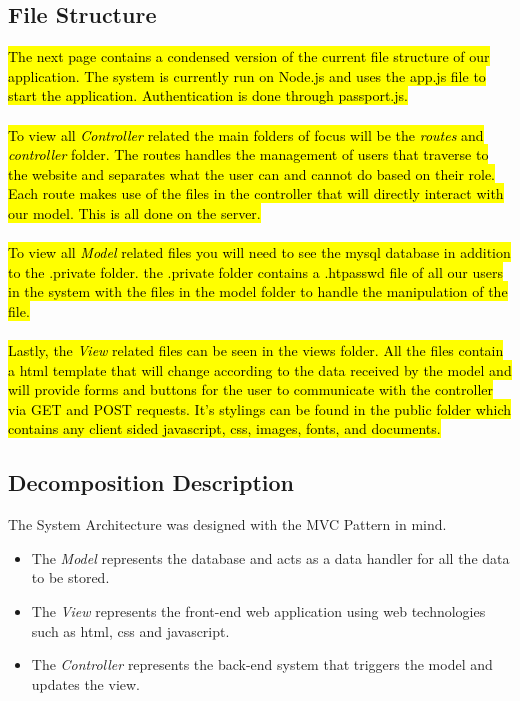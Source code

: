 \documentclass[fontsize=12pt,paper=letter,twoside]{scrartcl}
\begin{document}
\subsection{File Structure}
\hl{The next page contains a condensed version of the current file structure of our application. The system is currently run on Node.js and uses the app.js file to start the application. Authentication is done through passport.js. \\ \\ To view all \emph{Controller} related the main folders of focus will be the \emph{routes} and \emph{controller} folder. The routes handles the management of users that traverse to the website and separates what the user can and cannot do based on their role. Each route makes use of the files in the controller  that will directly interact with our model. This is all done on the server. \\
\\ To view all \emph{Model} related files you will need to see the mysql database in addition to the .private folder. the .private folder contains a .htpasswd file of all our users in the system with the files in the model folder to handle the manipulation of the file. \\
\\ Lastly, the \emph{View} related files can be seen in the views folder. All the files contain a html template that will change according to the data received by the model and will provide forms and buttons for the user to communicate with the controller via GET and POST requests. It's stylings can be found in the public folder which contains any client sided javascript, css, images, fonts, and documents.}

\clearpage
\newpage 

\clearpage
\newpage 
\subsection{Decomposition Description}

The System Architecture was designed with the MVC Pattern in mind.

\begin{itemize}
\item The \emph{Model} represents the database and acts as a data handler for all the data to be stored.

\item The \emph{View} represents the front-end web application using web technologies such as html, css and javascript. 

\item The \emph{Controller} represents the back-end system that triggers the model and updates the view.
\end{itemize}
\end{document}
